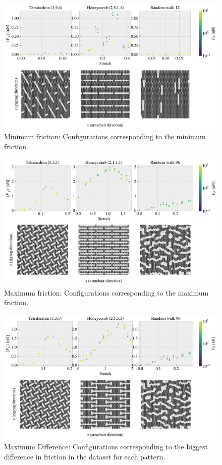 \begin{figure}[H]
  \centering
  \includegraphics[width=\linewidth]{figures/stretch_profiles/PP_min.pdf}
  \caption{Minimum friction: Configurations corresponding to the minimum friction.}
  \label{fig:PP_min}
\end{figure}


\begin{figure}[H]
  \centering
  \includegraphics[width=\linewidth]{figures/stretch_profiles/PP_max.pdf}
  \caption{Maximum friction: Configurations corresponding to the maximum friction.}
  \label{fig:PP_max}
\end{figure}


\begin{figure}[H]
  \centering
  \includegraphics[width=\linewidth]{figures/stretch_profiles/PP_max_diff.pdf}
  \caption{Maximum Difference: Configurations corresponding to the biggest difference in friction in the dataset for each pattern.}
  \label{fig:PP_max_diff}
\end{figure}  

